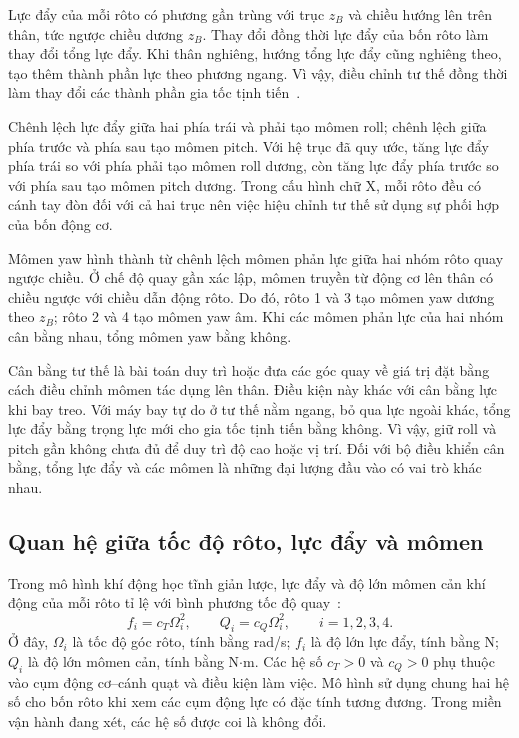 Lực đẩy của mỗi rôto có phương gần trùng với trục $z_B$ và chiều hướng lên trên thân, tức ngược chiều dương $z_B$. Thay đổi đồng thời lực đẩy của bốn rôto làm thay đổi tổng lực đẩy. Khi thân nghiêng, hướng tổng lực đẩy cũng nghiêng theo, tạo thêm thành phần lực theo phương ngang. Vì vậy, điều chỉnh tư thế đồng thời làm thay đổi các thành phần gia tốc tịnh tiến~\cite{bouabdallah2004design}.

Chênh lệch lực đẩy giữa hai phía trái và phải tạo mômen roll; chênh lệch giữa phía trước và phía sau tạo mômen pitch. Với hệ trục đã quy ước, tăng lực đẩy phía trái so với phía phải tạo mômen roll dương, còn tăng lực đẩy phía trước so với phía sau tạo mômen pitch dương. Trong cấu hình chữ X, mỗi rôto đều có cánh tay đòn đối với cả hai trục nên việc hiệu chỉnh tư thế sử dụng sự phối hợp của bốn động cơ.

Mômen yaw hình thành từ chênh lệch mômen phản lực giữa hai nhóm rôto quay ngược chiều. Ở chế độ quay gần xác lập, mômen truyền từ động cơ lên thân có chiều ngược với chiều dẫn động rôto. Do đó, rôto 1 và 3 tạo mômen yaw dương theo $z_B$; rôto 2 và 4 tạo mômen yaw âm. Khi các mômen phản lực của hai nhóm cân bằng nhau, tổng mômen yaw bằng không.

Cân bằng tư thế là bài toán duy trì hoặc đưa các góc quay về giá trị đặt bằng cách điều chỉnh mômen tác dụng lên thân. Điều kiện này khác với cân bằng lực khi bay treo. Với máy bay tự do ở tư thế nằm ngang, bỏ qua lực ngoài khác, tổng lực đẩy bằng trọng lực mới cho gia tốc tịnh tiến bằng không. Vì vậy, giữ roll và pitch gần không chưa đủ để duy trì độ cao hoặc vị trí. Đối với bộ điều khiển cân bằng, tổng lực đẩy và các mômen là những đại lượng đầu vào có vai trò khác nhau.

\subsection{Quan hệ giữa tốc độ rôto, lực đẩy và mômen}

Trong mô hình khí động học tĩnh giản lược, lực đẩy và độ lớn mômen cản khí động của mỗi rôto tỉ lệ với bình phương tốc độ quay~\cite{chovancova2014mathematical}:
\begin{equation}
	f_i=c_T\Omega_i^2,\qquad Q_i=c_Q\Omega_i^2,
	\qquad i=1,2,3,4.
	\label{eq:background-rotor-force}
\end{equation}
Ở đây, $\Omega_i$ là tốc độ góc rôto, tính bằng rad/s; $f_i$ là độ lớn lực đẩy, tính bằng N; $Q_i$ là độ lớn mômen cản, tính bằng N$\cdot$m. Các hệ số $c_T>0$ và $c_Q>0$ phụ thuộc vào cụm động cơ--cánh quạt và điều kiện làm việc. Mô hình sử dụng chung hai hệ số cho bốn rôto khi xem các cụm động lực có đặc tính tương đương. Trong miền vận hành đang xét, các hệ số được coi là không đổi.

